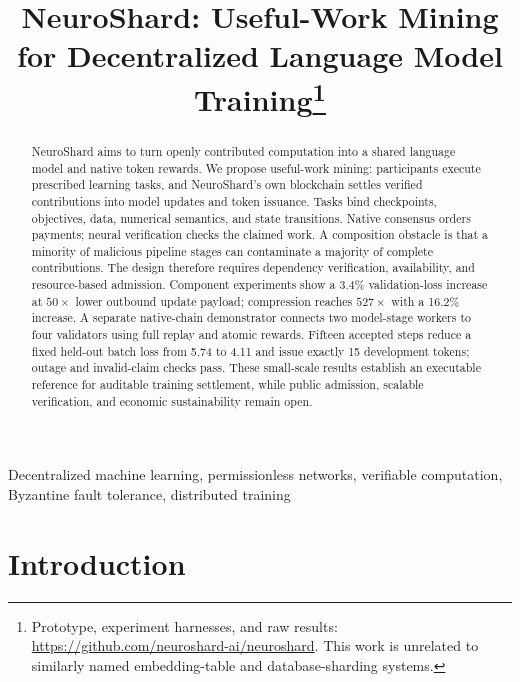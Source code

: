 \documentclass[conference]{IEEEtran}
\begin{document}
\title{NeuroShard: Useful-Work Mining for Decentralized Language Model Training\thanks{Prototype, experiment harnesses, and raw results: \protect\url{https://github.com/neuroshard-ai/neuroshard}. This work is unrelated to similarly named embedding-table and database-sharding systems.}}

\author{
}

\maketitle

\begin{abstract}
NeuroShard aims to turn openly contributed computation into a shared language model and native token rewards. We propose useful-work mining: participants execute prescribed learning tasks, and NeuroShard's own blockchain settles verified contributions into model updates and token issuance. Tasks bind checkpoints, objectives, data, numerical semantics, and state transitions. Native consensus orders payments; neural verification checks the claimed work. A composition obstacle is that a minority of malicious pipeline stages can contaminate a majority of complete contributions. The design therefore requires dependency verification, availability, and resource-based admission. Component experiments show a 3.4\% validation-loss increase at $50\times$ lower outbound update payload; compression reaches $527\times$ with a 16.2\% increase. A separate native-chain demonstrator connects two model-stage workers to four validators using full replay and atomic rewards. Fifteen accepted steps reduce a fixed held-out batch loss from 5.74 to 4.11 and issue exactly 15 development tokens; outage and invalid-claim checks pass. These small-scale results establish an executable reference for auditable training settlement, while public admission, scalable verification, and economic sustainability remain open.
\end{abstract}

\begin{IEEEkeywords}
Decentralized machine learning, permissionless networks, verifiable computation, Byzantine fault tolerance, distributed training
\end{IEEEkeywords}

\section{Introduction}
\end{document}
